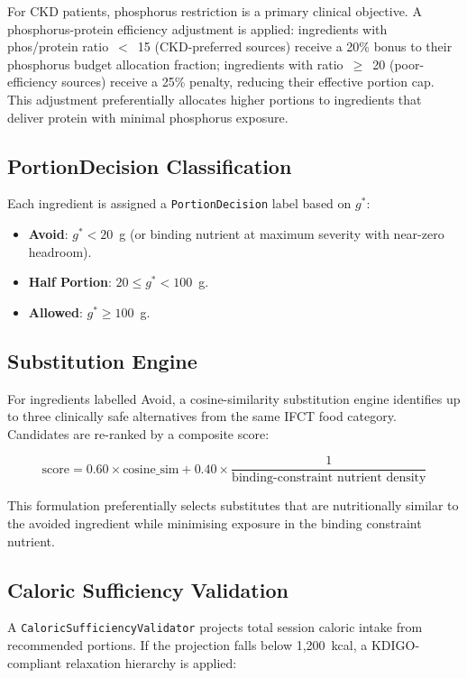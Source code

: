 \documentclass[journal]{IEEEtran}
\begin{document}
For CKD patients, phosphorus restriction is a primary clinical
objective. A phosphorus-protein efficiency adjustment is applied:
ingredients with phos/protein ratio~$<$~15 (CKD-preferred sources)
receive a 20\% bonus to their phosphorus budget allocation fraction;
ingredients with ratio~$\geq$~20 (poor-efficiency sources) receive a
25\% penalty, reducing their effective portion cap. This adjustment
preferentially allocates higher portions to ingredients that deliver
protein with minimal phosphorus exposure.

\subsection{PortionDecision Classification}

Each ingredient is assigned a \texttt{PortionDecision} label based on
$g^*$:
\begin{itemize}
    \item \textbf{Avoid}: $g^* < 20$~g (or binding nutrient at maximum
    severity with near-zero headroom).
    \item \textbf{Half Portion}: $20 \leq g^* < 100$~g.
    \item \textbf{Allowed}: $g^* \geq 100$~g.
\end{itemize}

\subsection{Substitution Engine}

For ingredients labelled Avoid, a cosine-similarity substitution engine
identifies up to three clinically safe alternatives from the same IFCT
food category. Candidates are re-ranked by a composite score:

\begin{equation}
\text{score} = 0.60 \times \text{cosine\_sim} + 0.40 \times \frac{1}{\text{binding-constraint nutrient density}}
\label{eq:substitution}
\end{equation}

This formulation preferentially selects substitutes that are
nutritionally similar to the avoided ingredient while minimising
exposure in the binding constraint nutrient.

\subsection{Caloric Sufficiency Validation}

A \texttt{CaloricSufficiencyValidator} projects total session caloric
intake from recommended portions. If the projection falls below
1,200~kcal, a KDIGO-compliant relaxation hierarchy is applied:
\end{document}
